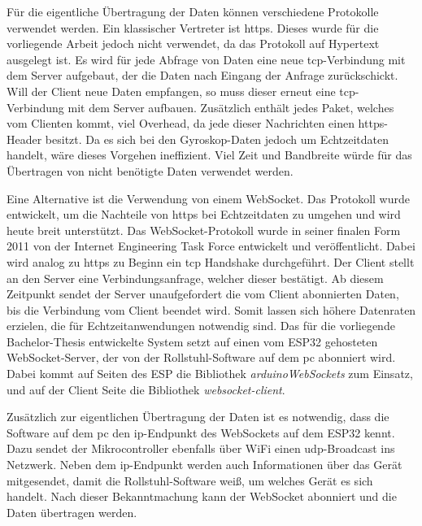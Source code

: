 Für die eigentliche Übertragung der Daten können verschiedene Protokolle verwendet werden.
Ein klassischer Vertreter ist \ac{https}.
Dieses wurde für die vorliegende Arbeit jedoch nicht verwendet, da das Protokoll auf Hypertext ausgelegt ist.
Es wird für jede Abfrage von Daten eine neue \ac{tcp}-Verbindung mit dem Server aufgebaut, der die Daten nach Eingang der Anfrage zurückschickt.
Will der Client neue Daten empfangen, so muss dieser erneut eine \ac{tcp}-Verbindung mit dem Server aufbauen\cite{ietfRFC6455WebSocket}.
Zusätzlich enthält jedes Paket, welches vom Clienten kommt, viel Overhead, da jede dieser Nachrichten einen \ac{https}-Header besitzt\cite{ietfRFC6455WebSocket}.
Da es sich bei den Gyroskop-Daten jedoch um Echtzeitdaten handelt, wäre dieses Vorgehen ineffizient.
Viel Zeit und Bandbreite würde für das Übertragen von nicht benötigte Daten verwendet werden.

Eine Alternative ist die Verwendung von einem WebSocket.
Das Protokoll wurde entwickelt, um die Nachteile von \ac{https} bei Echtzeitdaten zu umgehen und wird heute breit unterstützt.
Das WebSocket-Protokoll wurde in seiner finalen Form 2011 von der Internet Engineering Task Force entwickelt und veröffentlicht\cite{ietfRFC6455WebSocket}.
Dabei wird analog zu \ac{https} zu Beginn ein \ac{tcp} Handshake durchgeführt. Der Client stellt an den Server eine Verbindungsanfrage, welcher dieser bestätigt.
Ab diesem Zeitpunkt sendet der Server unaufgefordert die vom Client abonnierten Daten, bis die Verbindung vom Client beendet wird\cite{ietfRFC6455WebSocket}.
Somit lassen sich höhere Datenraten erzielen, die für Echtzeitanwendungen notwendig sind.
Das für die vorliegende Bachelor-Thesis entwickelte System setzt auf einen vom ESP32 gehosteten WebSocket-Server, der von der Rollstuhl-Software auf dem \ac{pc} abonniert wird.
Dabei kommt auf Seiten des ESP die Bibliothek \textit{arduinoWebSockets}\cite{markusWebSocketServerClient2022} zum Einsatz, und auf der Client Seite die Bibliothek \textit{websocket-client}\cite{kotasWebsocketclient2022}.

Zusätzlich zur eigentlichen Übertragung der Daten ist es notwendig, dass die Software auf dem \ac{pc} den \ac{ip}-Endpunkt des WebSockets auf dem ESP32 kennt.
Dazu sendet der Mikrocontroller ebenfalls über WiFi einen \ac{udp}-Broadcast ins Netzwerk.
Neben dem \ac{ip}-Endpunkt werden auch Informationen über das Gerät mitgesendet, damit die Rollstuhl-Software weiß, um welches Gerät es sich handelt.
Nach dieser Bekanntmachung kann der WebSocket abonniert und die Daten übertragen werden.

